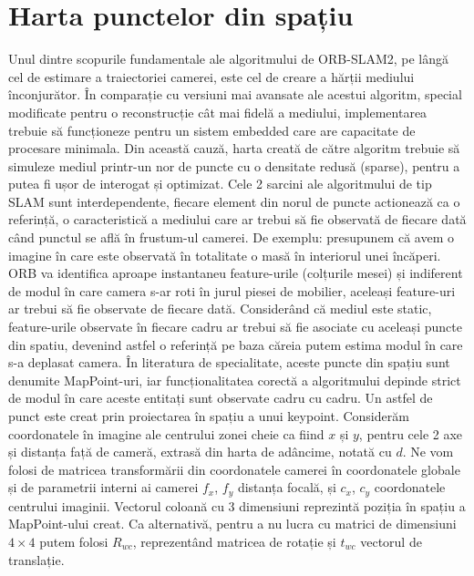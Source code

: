 \documentclass[12pt,a4paper]{report}
\begin{document}
\section{Harta punctelor din spațiu}
Unul dintre scopurile fundamentale ale algoritmului de ORB-SLAM2, pe lângă cel 
de estimare a traiectoriei camerei, este cel de creare a hărții mediului
înconjurător. În comparație cu versiuni mai avansate ale
acestui algoritm, special modificate pentru o reconstrucție cât mai fidelă a mediului,
implementarea trebuie să funcționeze pentru un sistem embedded care are  
capacitate de procesare minimala. Din această cauză, harta creată 
de către algoritm trebuie să simuleze mediul printr-un nor de puncte cu o
densitate redusă (sparse), pentru a putea fi ușor de interogat și optimizat. 
Cele 2 sarcini ale algoritmului de tip SLAM sunt interdependente, fiecare 
element din norul de puncte actionează ca o referință, o caracteristică a mediului care
ar trebui să fie observată de fiecare 
dată când punctul se află în frustum-ul camerei. De exemplu: presupunem că avem
o imagine în care este observată în totalitate o masă în interiorul unei încăperi. 
ORB va identifica aproape instantaneu feature-urile (colțurile mesei) și
indiferent de modul în care camera s-ar roti în jurul piesei de mobilier, aceleași feature-uri
ar trebui să fie observate de fiecare dată. Considerând că mediul 
este static, feature-urile observate în fiecare cadru ar trebui să fie asociate cu aceleași puncte din spatiu, 
devenind astfel o referință pe baza căreia putem estima modul în care s-a deplasat camera. 
În literatura de specialitate, aceste puncte din spațiu sunt denumite MapPoint-uri, 
iar funcționalitatea corectă a algoritmului depinde strict de 
modul în care aceste entitați sunt observate cadru cu cadru. Un astfel de punct 
este creat prin proiectarea în spațiu a unui keypoint. Considerăm 
coordonatele în imagine ale centrului zonei cheie ca fiind  \(x\) și \(y\), pentru cele 
2 axe și distanța față de cameră, extrasă din harta de adâncime, notată cu \(d\). Ne vom 
folosi de matricea transformării din coordonatele camerei
în coordonatele globale și de parametrii interni ai camerei \(f_x\), \(f_y\) 
distanța focală, și \(c_x\), \(c_y\) coordonatele centrului imaginii.
Vectorul coloană cu 3 dimensiuni reprezintă poziția în spațiu a MapPoint-ului creat.
Ca alternativă, pentru a nu lucra cu matrici de dimensiuni $ 4 \times 4 $ putem folosi \(R_{wc}\), reprezentând
matricea de rotație și \(t_{wc}\) vectorul de translație.
\end{document}
